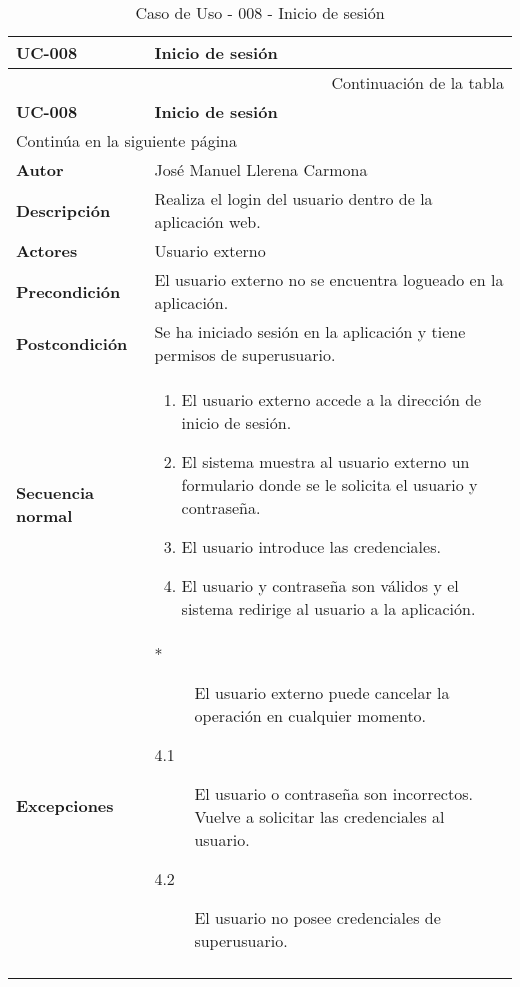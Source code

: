 \begin{center}
\begin{longtable}{||p{3.4cm}|p{12cm}||}
 \hline \hline \bf UC-008 &  \bf Inicio de sesión \\
\hline
\endfirsthead
\hline \multicolumn{2}{|r|}{{Continuación de la tabla}} \\ \hline
 \hline \bf UC-008 &  \bf Inicio de sesión \\
\hline
\endhead
\hline \multicolumn{2}{|l|}{{Continúa en la siguiente página}} \\ \hline
\endfoot
\endlastfoot
 \hline \bf Autor & José Manuel Llerena Carmona \\
 \hline \bf Descripción & Realiza el login del usuario dentro de la aplicación
        web.\\
 \hline \bf Actores & Usuario externo\\
 \hline \bf Precondición & El usuario externo no se encuentra logueado en la
        aplicación.\\
 \hline \bf Postcondición & Se ha iniciado sesión en la aplicación y tiene
            permisos de superusuario.\\
 \hline \bf Secuencia normal & 
             \begin{enumerate}
                \item El usuario externo accede a la dirección de inicio de
                      sesión.
                \item El sistema muestra al usuario externo un formulario donde
                      se le solicita el usuario y contraseña.
                \item El usuario introduce las credenciales.
                \item El usuario y contraseña son válidos y el sistema redirige
                      al usuario a la aplicación.
             \end{enumerate}\\
 \hline \bf Excepciones &
             \begin{description}
                \item[*] El usuario externo puede cancelar la operación en
                          cualquier momento.
                \item[4.1] El usuario o contraseña son incorrectos. Vuelve a
                      solicitar las credenciales al usuario.
                \item[4.2] El usuario no posee credenciales de superusuario.
             \end{description}\\
\hline
\hline
\caption{\label{tab:caso008} Caso de Uso - 008 - Inicio de sesión} 
\end{longtable}
\end{center}


